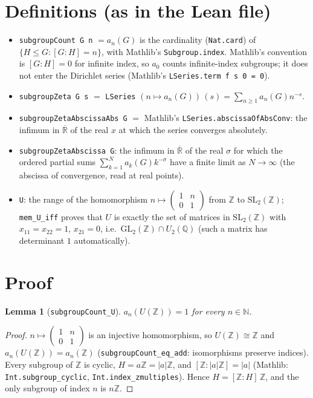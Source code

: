 \documentclass[11pt]{article}
\newtheorem{lemma}[theorem]{Lemma}
\theoremstyle{definition}
\newcommand{\Z}{\mathbb Z}
\newcommand{\Q}{\mathbb Q}
\begin{document}
\section{Definitions (as in the Lean file)}
\begin{itemize}
\item \texttt{subgroupCount G n} $=a_n(G)$ is the cardinality (\texttt{Nat.card}) of
$\{H\le G : [G:H]=n\}$, with Mathlib's \texttt{Subgroup.index}. Mathlib's convention is
$[G:H]=0$ for infinite index, so $a_0$ counts infinite-index subgroups; it does not enter the
Dirichlet series (Mathlib's \texttt{LSeries.term f s 0 = 0}).
\item \texttt{subgroupZeta G s} $=$ \texttt{LSeries} $(n\mapsto a_n(G))\,(s)=\sum_{n\ge1}a_n(G)n^{-s}$.
\item \texttt{subgroupZetaAbscissaAbs G} $=$ Mathlib's \texttt{LSeries.abscissaOfAbsConv}: the
infimum in $\overline{\mathbb R}$ of the real $x$ at which the series converges absolutely.
\item \texttt{subgroupZetaAbscissa G}: the infimum in $\overline{\mathbb R}$ of the real
$\sigma$ for which the ordered partial sums $\sum_{k=1}^{N}a_k(G)k^{-\sigma}$ have a finite limit
as $N\to\infty$ (the abscissa of convergence, read at real points).
\item \texttt{U}: the range of the homomorphism $n\mapsto\left(\begin{smallmatrix}1&n\\0&1\end{smallmatrix}\right)$
from $\Z$ to $\mathrm{SL}_2(\Z)$; \texttt{mem\_U\_iff} proves that $U$ is exactly the set of
matrices in $\mathrm{SL}_2(\Z)$ with $x_{11}=x_{22}=1$, $x_{21}=0$, i.e.\ $\mathrm{GL}_2(\Z)\cap U_2(\Q)$
(such a matrix has determinant $1$ automatically).
\end{itemize}

\section{Proof}
\begin{lemma}[\texttt{subgroupCount\_U}]
$a_n(U(\Z))=1$ for every $n\in\mathbb N$.
\end{lemma}
\begin{proof}
$n\mapsto\left(\begin{smallmatrix}1&n\\0&1\end{smallmatrix}\right)$ is an injective homomorphism,
so $U(\Z)\cong\Z$ and $a_n(U(\Z))=a_n(\Z)$ (\texttt{subgroupCount\_eq\_add}: isomorphisms preserve
indices). Every subgroup of $\Z$ is cyclic, $H=a\Z=|a|\Z$, and $[\Z:|a|\Z]=|a|$ (Mathlib:
\texttt{Int.subgroup\_cyclic}, \texttt{Int.index\_zmultiples}). Hence $H=[\Z:H]\,\Z$, and the
only subgroup of index $n$ is $n\Z$.
\end{proof}
\end{document}

